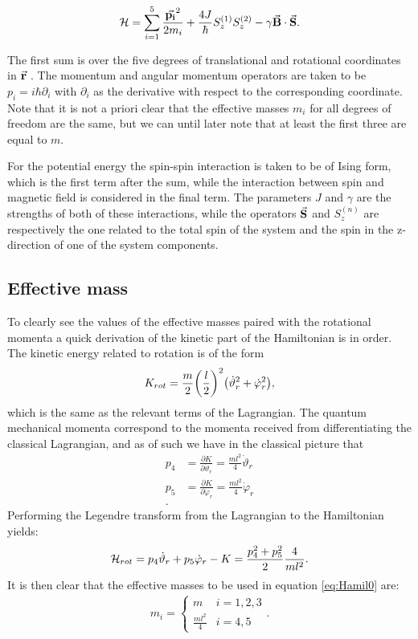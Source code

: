 \documentclass[a4paper]{article}
\begin{document}
\begin{equation}\label{eq:Hamil0}
        \mathbb{\cal H} = \sum_{i=1}^{5} \frac{\va{p_i}^2}{2m_i} +
        \frac{4J}{\hbar{}}S^{(1)}_{z}S^{(2)}_{z} -
        \gamma\va{B}\cdot \va{S}.
\end{equation}

The first sum is over the five degrees of translational and rotational coordinates in \(\va{r}\)
. The momentum and angular
momentum operators are
taken to be \(p_i = i\hbar \partial_i\label{def:mom}\) with \(\partial_i\) as the derivative with respect
to the
corresponding coordinate. Note that it is not a priori clear that the effective masses
\(m_i\) for
all degrees of freedom are the same, but we can until later note that at least the first
three are equal to \(m\).

For the potential energy the spin-spin interaction is taken to be of Ising form, which is
the first term after the sum, while the interaction between spin and magnetic field is
considered in the final term. %
 The parameters \(J\) and \(\gamma\) are the strengths of both
of these interactions, while the operators \(\va{S}\) and \(S^{(n)}_{z}\) are respectively
the one
related to the total spin of the system and the spin in the z-direction of one of the
system
components.

\subsection{Effective mass}
To clearly see the values of the effective masses paired with the rotational momenta a quick derivation
of the kinetic part of the Hamiltonian is in order. The kinetic energy related to rotation
is of the form \[
K_{rot}= \frac{m}{2}\pqty{\frac{l}{2}}^2\pqty{\dot \vartheta_r^2 + \dot \varphi_r^2} %
,\] 
which is the same as the relevant terms of the Lagrangian. The quantum mechanical momenta
correspond to the momenta received from differentiating the classical Lagrangian, and as
of %
such we have in the classical picture that 
\begin{align*}
        p_4 &= \frac{\partial K}{\partial \dot \vartheta_r} = \frac{ml^2}{4}\dot \vartheta_r\\
        p_5 &= \frac{\partial K}{\partial \dot \varphi_r} = \frac{ml^2}{4}\dot \varphi_r\\
.\end{align*}
Performing the Legendre transform from the Lagrangian to the Hamiltonian yields:
\begin{align*}
        \mathbb{\cal H}_{rot}= p_4 \dot\vartheta_r + p_5 \dot\varphi_r - K = \frac{
        p_4^2 + p_5^2}{2} \frac{4}{ml^2}
.\end{align*}
It is then clear that the effective masses to be used in equation \ref{eq:Hamil0} are:
\begin{align*}
        m_i = \begin{cases}
                m & i = 1, 2, 3\\
                \frac{ml^2}{4} & i = 4, 5
        \end{cases}
.\end{align*}
\end{document}
